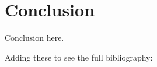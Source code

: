 \documentclass[12pt, letterpaper, titlepage]{article}
\begin{document}
\hypertarget{sec:conclusion}{%
\section{Conclusion}\label{sec:conclusion}}

Conclusion here.

Adding these to see the full bibliography: 

\citet{Weiss}
\citet{Arnold}
\citet{Conover}
\citet{Gleser}
\citet{Butorina}
\citet{Racine}
\citet{Wang}
\citet{Dimitrova}



\end{document}
